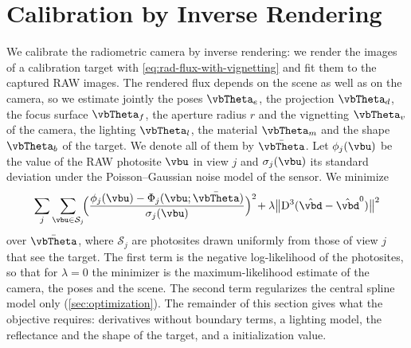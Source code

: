 \section{Calibration by Inverse Rendering}
\label{sec:calibration-pipeline}
We calibrate the radiometric camera by inverse rendering: we render
the images of a calibration target with
\cref{eq:rad-flux-with-vignetting} and fit them to the captured RAW
images. The rendered flux depends on the scene as well as on the
camera, so we estimate jointly the poses $\vbTheta_e$, the
projection $\vbTheta_d$, the focus surface $\vbTheta_f$, the aperture
radius $r$ and the vignetting $\vbTheta_v$ of the camera, the
lighting $\vbTheta_l$, the material $\vbTheta_m$ and the shape
$\vbTheta_b$ of the target. We denote all of them by
$\bar{\vbTheta}$. Let $\phi_j(\vbu)$ be the value of the RAW
photosite $\vbu$ in view $j$ and $\sigma_j(\vbu)$ its standard
deviation under the Poisson--Gaussian noise model of the sensor. We
minimize
\begin{equation}
\label{eq:objective}
    \sum_{j}\sum_{\vbu\in\mathcal{S}_j}\!
    \Bigl(\frac{\phi_j(\vbu)-\Phi_j(\vbu;\bar{\vbTheta})}{\sigma_j(\vbu)}\Bigr)^{2}\!
    + \lambda\bigl\lVert \mathrm{D}^3(\hat{\vbd}-\hat{\vbd}^{0})\bigr\rVert^{2}
\end{equation}
over $\bar{\vbTheta}$, where $\mathcal{S}_j$ are photosites drawn
uniformly from those of view $j$ that see the target. The first term
is the negative log-likelihood of the photosites, so that for
$\lambda=0$ the minimizer is the maximum-likelihood estimate of the
camera, the poses and the scene. The second term regularizes the
central spline model only (\cref{sec:optimization}). The remainder of
this section gives what the objective requires: derivatives without
boundary terms, a lighting model, the
reflectance and the shape of the target, and a initialization value.

